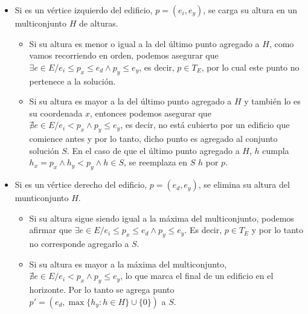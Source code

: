\begin{itemize}
  \item Si es un vértice izquierdo del edificio, $p = (e_i, e_y)$, se carga su
  altura en un multiconjunto $H$ de alturas.
  \begin{itemize}
    \item Si su altura es menor o igual a la del último punto agregado a $H$,
    como vamos recorriendo en orden, podemos asegurar que $\exists e \in E /
    e_i \leq p_x \leq e_d \land p_y \leq e_y$, es decir, $p \in T_E$, por lo
    cual este punto no pertenece a la solución.

    \item Si su altura es mayor a la del último punto agregado a $H$ y también
    lo es su coordenada $x$, entonces podemos asegurar que $\nexists e \in E /
    e_i < p_x \land p_y \leq e_y$, es decir, no está cubierto por un edificio
    que comience antes y por lo tanto, dicho punto es agregado al conjunto
    solución $S$. En el caso de que el último punto agregado a $H$, $h$
    cumpla $h_x = p_x \wedge h_y < p_y \wedge h \in S$, se reemplaza en $S$
    $h$ por $p$.

  \end{itemize}

  \item Si es un vértice derecho del edificio, $p = (e_d, e_y)$, se elimina su
  altura del munticonjunto $H$.
  \begin{itemize}
    \item Si su altura sigue siendo igual a la máxima del multiconjunto, podemos
    afirmar que $\exists e \in E / e_i \leq p_x \leq e_d \land p_y \leq
    e_y$. Es decir, $p \in T_E$ y por lo tanto no corresponde agregarlo a
    $S$.

    \item Si su altura es mayor a la máxima del multiconjunto,
    $\nexists e \in E / e_i < p_x \land p_y \leq e_y$, lo que marca el
    final de un edificio en el horizonte. Por lo tanto se agrega punto $p' =
    (e_d, \max\{h_y : h \in H\} \cup \{0\})$ a $S$.
  \end{itemize}
\end{itemize}

